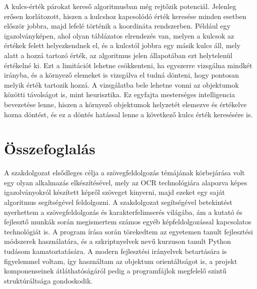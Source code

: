 \documentclass[12pt]{report}
\begin{document}
A kulcs-érték párokat kereső algoritmusban még rejtőzik potenciál. Jelenleg erősen korlátozott, hiszen a kulcshoz kapcsolódó érték keresése minden esetben először jobbra, majd lefelé történik a koordináta rendszerben. Például egy igazolványképen, ahol olyan táblázatos elrendezés van, melyen a kulcsok az értékek felett helyezkendnek el, és a kulcstól jobbra egy másik kulcs áll, mely alatt a hozzá tartozó érték, az algoritmus jelen állapotában ezt helytelenül értékelné ki. Ezt a limitációt lehetne csökkenteni, ha egyszerre vizsgálna mindkét irányba, és a környező elemeket is vizsgálva el tudná dönteni, hogy pontosan melyik érték tartozik hozzá. A vizsgálatba bele lehetne vonni az objektumok közötti távolságot is, mint heurisztika.
Ez egyfajta mesterséges intelligencia bevezetése lenne, hiszen a környező objektumok helyzetét elemezve és értékelve hozna döntést, és ez a döntés hatással lenne a következő kulcs érték keresésére is.

\chapter*{Összefoglalás}

A szakdolgozat elsődleges célja a szövegfeldolgozás témájának körbejárása volt egy olyan alkalmazás elkészítésével, mely az OCR technológiára alapozva képes igazolványokról készített képről szöveget kinyerni, majd ezeket egy saját algoritmus segítségével feldolgozni. A szakdolgozat segítségével betekintést nyerhettem a szövegfeldolgozás és karakterfelimserés világába, ám a kutató és fejlesztő munkák során megismertem számos egyéb képfeldolgozással kapcsolatos technológiát is. A program írása során törekedtem az egyetemen tanult fejlesztési módszerek használatára, és a szkriptnyelvek nevű kurzuson tanult Python tudásom kamatoztatására.
A modern fejlesztési irányelvek betartására is figyelemmel voltam, így használtam az objektum orientáltságot is, a projekt komponenseinek átláthatóságáról pedig a programfájlok megfelelő szintű struktúráltsága gondoskodik.
\end{document}
